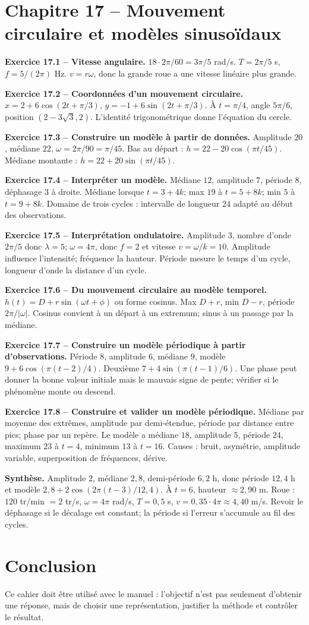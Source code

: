 \documentclass[11pt,a4paper,openany]{book}
\begin{document}
\chapter*{Chapitre 17 -- Mouvement circulaire et modèles sinusoïdaux}
\begin{answerbox}
\textbf{Exercice 17.1 -- Vitesse angulaire.} $18\cdot2\pi/60=3\pi/5$ rad/s. $T=2\pi/5$ s, $f=5/(2\pi)$ Hz. $v=r\omega$, donc la grande roue a une vitesse linéaire plus grande.\par
\textbf{Exercice 17.2 -- Coordonnées d'un mouvement circulaire.} $x=2+6\cos(2t+\pi/3)$, $y=-1+6\sin(2t+\pi/3)$. À $t=\pi/4$, angle $5\pi/6$, position $(2-3\sqrt3,2)$. L'identité trigonométrique donne l'équation du cercle.\par
\textbf{Exercice 17.3 -- Construire un modèle à partir de données.} Amplitude $20$, médiane $22$, $\omega=2\pi/90=\pi/45$. Bas au départ : $h=22-20\cos(\pi t/45)$. Médiane montante : $h=22+20\sin(\pi t/45)$.\par
\textbf{Exercice 17.4 -- Interpréter un modèle.} Médiane $12$, amplitude $7$, période $8$, déphasage $3$ à droite. Médiane lorsque $t=3+4k$; max $19$ à $t=5+8k$; min $5$ à $t=9+8k$. Domaine de trois cycles : intervalle de longueur $24$ adapté au début des observations.\par
\textbf{Exercice 17.5 -- Interprétation ondulatoire.} Amplitude $3$, nombre d'onde $2\pi/5$ donc $\lambda=5$; $\omega=4\pi$, donc $f=2$ et vitesse $v=\omega/k=10$. Amplitude influence l'intensité; fréquence la hauteur. Période mesure le temps d'un cycle, longueur d'onde la distance d'un cycle.\par
\textbf{Exercice 17.6 -- Du mouvement circulaire au modèle temporel.} $h(t)=D+r\sin(\omega t+\phi)$ ou forme cosinus. Max $D+r$, min $D-r$, période $2\pi/|\omega|$. Cosinus convient à un départ à un extremum; sinus à un passage par la médiane.\par
\textbf{Exercice 17.7 -- Construire un modèle périodique à partir d'observations.} Période $8$, amplitude $6$, médiane $9$, modèle $9+6\cos(\pi(t-2)/4)$. Deuxième $7+4\sin(\pi(t-1)/6)$. Une phase peut donner la bonne valeur initiale mais le mauvais signe de pente; vérifier si le phénomène monte ou descend.\par
\textbf{Exercice 17.8 -- Construire et valider un modèle périodique.} Médiane par moyenne des extrêmes, amplitude par demi-étendue, période par distance entre pics; phase par un repère. Le modèle a médiane $18$, amplitude $5$, période $24$, maximum $23$ à $t=4$, minimum $13$ à $t=16$. Causes : bruit, asymétrie, amplitude variable, superposition de fréquences, dérive.\par
\medskip\textbf{Synthèse.} Amplitude $2$, médiane $2{,}8$, demi-période $6{,}2$ h, donc période $12{,}4$ h et modèle $2{,}8+2\cos(2\pi(t-3)/12{,}4)$. À $t=6$, hauteur $\approx2{,}90$ m. Roue : $120$ tr/min $=2$ tr/s, $\omega=4\pi$ rad/s, $T=0{,}5$ s, $v=0{,}35\cdot4\pi\approx4{,}40$ m/s. Revoir le déphasage si le décalage est constant; la période si l'erreur s'accumule au fil des cycles.
\end{answerbox}
\fi
\backmatter
\chapter*{Conclusion}
Ce cahier doit être utilisé avec le manuel : l'objectif n'est pas seulement d'obtenir une réponse, mais de choisir une représentation, justifier la méthode et contrôler le résultat.
\end{document}
